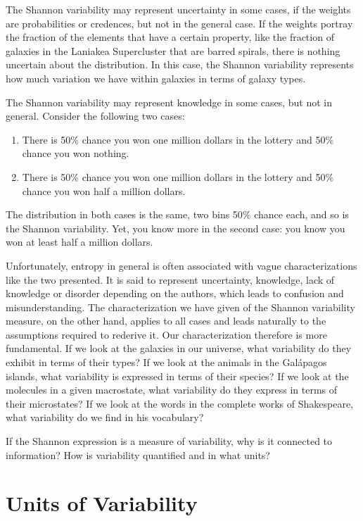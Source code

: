 \documentclass[prb, twocolumn]{revtex4-1}
\begin{document}
The Shannon variability may represent uncertainty in some cases, if the weights are probabilities or credences, but not in the general case. If the weights portray the fraction of the elements that have a certain property, like the fraction of galaxies in the Laniakea Supercluster that are barred spirals, there is nothing uncertain about the distribution. In this case, the Shannon variability represents how much variation we have within galaxies in terms of galaxy types.

The Shannon variability may represent knowledge in some cases, but not in general. Consider the following two cases:
\begin{enumerate}
\item There is 50\% chance you won one million dollars in the lottery and 50\% chance you won nothing.
\item There is 50\% chance you won one million dollars in the lottery and 50\% chance you won half a million dollars.
\end{enumerate}
The distribution in both cases is the same, two bins 50\% chance each, and so is the Shannon variability. Yet, you know more in the second case: you know you won at least half a million dollars.

Unfortunately, entropy in general is often associated with vague characterizations like the two presented. It is said to represent uncertainty, knowledge, lack of knowledge or disorder depending on the authors, which leads to confusion and misunderstanding.  The characterization we have given of the Shannon variability measure, on the other hand, applies to all cases and leads naturally to the assumptions required to rederive it. Our characterization therefore is more fundamental. If we look at the galaxies in our universe, what variability do they exhibit in terms of their types? If we look at the animals in the Gal\'{a}pagos islands, what variability is expressed in terms of their species? If we look at the molecules in a given macrostate, what variability do they express in terms of their microstates? If we look at the words in the complete works of Shakespeare, what variability do we find in his vocabulary?

If the Shannon expression is a measure of variability, why is it connected to information? How is variability quantified and in what units?

\section{Units of Variability\label{uv}}
\end{document}
